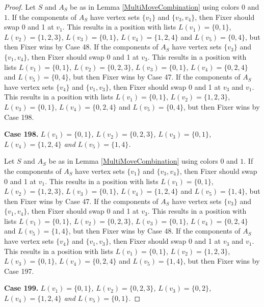 \documentclass[12pt]{amsart}
\theoremstyle{plain}
\theoremstyle{definition}
\theoremstyle{remark}
\begin{document}
\begin{proof}
Let $S$ and $A_S$ be as in Lemma \ref{MultiMoveCombination} using colors $0$ and $1$. If the components of $A_S$ have vertex sets $\{v_1\}$ and $\{v_3, v_4\}$, then Fixer should swap 0 and 1 at $v_1$. This results in a position with lists $L(v_1) = \{0, 1\}$, $L(v_2) = \{1, 2, 3\}$, $L(v_3) = \{0, 1\}$, $L(v_4) = \{1, 2, 4\}$ and $L(v_5) = \{0, 4\}$, but then Fixer wins by Case 48.
If the components of $A_S$ have vertex sets $\{v_3\}$ and $\{v_1, v_4\}$, then Fixer should swap 0 and 1 at $v_3$. This results in a position with lists $L(v_1) = \{0, 1\}$, $L(v_2) = \{0, 2, 3\}$, $L(v_3) = \{0, 1\}$, $L(v_4) = \{0, 2, 4\}$ and $L(v_5) = \{0, 4\}$, but then Fixer wins by Case 47.
If the components of $A_S$ have vertex sets $\{v_4\}$ and $\{v_1, v_3\}$, then Fixer should swap 0 and 1 at $v_3$ and $v_1$. This results in a position with lists $L(v_1) = \{0, 1\}$, $L(v_2) = \{1, 2, 3\}$, $L(v_3) = \{0, 1\}$, $L(v_4) = \{0, 2, 4\}$ and $L(v_5) = \{0, 4\}$, but then Fixer wins by Case 198.

\noindent\textbf{Case 198.  }\textit{$L(v_1) = \{0, 1\}$, $L(v_2) = \{0, 2, 3\}$, $L(v_3) = \{0, 1\}$, $L(v_4) = \{1, 2, 4\}$ and $L(v_5) = \{1, 4\}$.}

Let $S$ and $A_S$ be as in Lemma \ref{MultiMoveCombination} using colors $0$ and $1$. If the components of $A_S$ have vertex sets $\{v_1\}$ and $\{v_3, v_4\}$, then Fixer should swap 0 and 1 at $v_1$. This results in a position with lists $L(v_1) = \{0, 1\}$, $L(v_2) = \{1, 2, 3\}$, $L(v_3) = \{0, 1\}$, $L(v_4) = \{1, 2, 4\}$ and $L(v_5) = \{1, 4\}$, but then Fixer wins by Case 47.
If the components of $A_S$ have vertex sets $\{v_3\}$ and $\{v_1, v_4\}$, then Fixer should swap 0 and 1 at $v_3$. This results in a position with lists $L(v_1) = \{0, 1\}$, $L(v_2) = \{0, 2, 3\}$, $L(v_3) = \{0, 1\}$, $L(v_4) = \{0, 2, 4\}$ and $L(v_5) = \{1, 4\}$, but then Fixer wins by Case 48.
If the components of $A_S$ have vertex sets $\{v_4\}$ and $\{v_1, v_3\}$, then Fixer should swap 0 and 1 at $v_3$ and $v_1$. This results in a position with lists $L(v_1) = \{0, 1\}$, $L(v_2) = \{1, 2, 3\}$, $L(v_3) = \{0, 1\}$, $L(v_4) = \{0, 2, 4\}$ and $L(v_5) = \{1, 4\}$, but then Fixer wins by Case 197.

\noindent\textbf{Case 199.  }\textit{$L(v_1) = \{0, 1\}$, $L(v_2) = \{0, 2, 3\}$, $L(v_3) = \{0, 2\}$, $L(v_4) = \{1, 2, 4\}$ and $L(v_5) = \{0, 1\}$.}


\end{proof}
\end{document}
